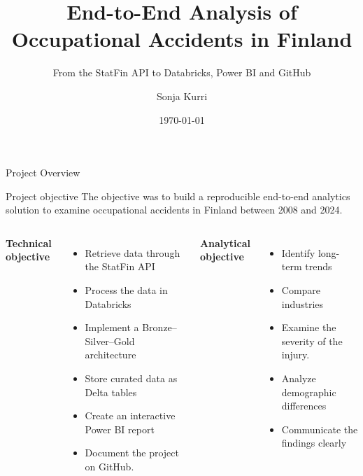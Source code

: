 \documentclass[aspectratio=169]{beamer}
\title[Occupational Accidents Project] {End-to-End Analysis of Occupational Accidents in Finland}
\subtitle{From the StatFin API to Databricks, Power BI and GitHub}
\author{Sonja Kurri}
\institute{Data Analytics Portfolio Project}
\date{\today}
\begin{document}
\begin{frame}
    \titlepage
\end{frame}

\begin{frame}{Project Overview}

\begin{block}{Project objective}
The objective was to build a reproducible end-to-end analytics solution
 to examine occupational accidents in Finland between 2008 and 2024.
\end{block}

\vspace{0.15cm}

\begin{columns}[T]
    \textbf{Technical objective}
    \begin{itemize}
        \item Retrieve data through the StatFin API
        \item Process the data in Databricks
        \item Implement a Bronze--Silver--Gold architecture
        \item Store curated data as Delta tables
        \item Create an interactive Power BI report
        \item Document the project on GitHub.
    \end{itemize}

    \textbf{Analytical objective}
    \begin{itemize}
        \item Identify long-term trends
        \item Compare industries
        \item Examine the severity of the injury.
        \item Analyze demographic differences
        \item Communicate the findings clearly
    \end{itemize}
\end{columns}

\end{frame}
\end{document}
